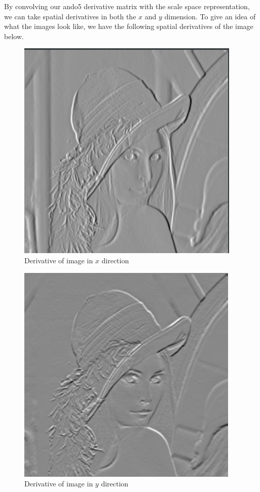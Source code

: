 \documentclass{article}
\begin{document}
By convolving our ando5 derivative matrix with the scale space representation, we can take spatial derivatives in both the $x$ and $y$ dimension. To give an idea of what the images look like, we have the following spatial derivatives of the image below.

\begin{figure}[H]
  \centering
  \includegraphics[scale=0.5]{Images/lx.png}
  \caption{Derivative of image in $x$ direction}
  \label{lx}
\end{figure}

\begin{figure}[H]
  \centering
  \includegraphics[scale=0.5]{Images/ly.png}
  \caption{Derivative of image in $y$ direction}
  \label{ly}
\end{figure}
\end{document}
